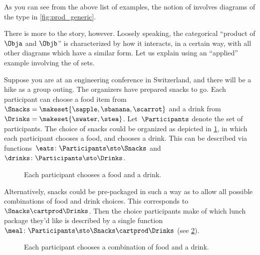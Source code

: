 As you can see from the above list of examples, the notion of  involves diagrams of the type in \cref{fig:prod_generic}.

There is more to the story, however.
Loosely speaking, the categorical ``product of $\Obja$ and $\Objb$'' is characterized by how it interacts, in a certain way, with all other diagrams which have a similar form.
Let us explain using an ``applied'' example involving the  of sets.

Suppose you are at an engineering conference in Switzerland, and there will be a hike as a group outing.
The organizers have prepared snacks to go.
Each participant can choose a food item from~$\Snacks=\makeset{\sapple,\sbanana,\scarrot}$ and a drink from~$\Drinks=\makeset{\swater,\stea}$.
Let~$\Participants$ denote the set of participants.
The choice of snacks could be organized as depicted in \cref{fig:snacks_1}, in which each participant chooses a food, and chooses a drink.
This can be described via functions~$\eats \colon \Participants \sto \Snacks$ and~$\drinks \colon  \Participants \sto \Drinks$.

\begin{figure}[h!]
    \centering
    \caption{Each participant chooses a food and a drink.}
    \label{fig:snacks_1}
\end{figure}

Alternatively, snacks could be pre-packaged in such a way as to allow all possible combinations of food and drink choices.
This corresponds to~$\Snacks\cartprod \Drinks$.
Then the choice participants make of which lunch package they'd like is described by a single function~$\meal \colon \Participants\sto \Snacks\cartprod \Drinks$ (see \cref{fig:snacks_2}).

\begin{figure}[h!]
    \centering
    \caption{Each participant chooses a combination of food and a drink. \label{fig:snacks_2}}
\end{figure}

